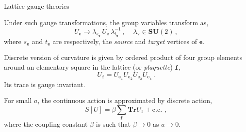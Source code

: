 \documentclass{beamer}
\newcommand\italictext[1]{\textcolor{italics}{\textit{#1}}}
\begin{document}
\begin{frame}{Lattice gauge theories}
    \begin{list}{\maltese}{\leftmargin=1em \itemindent=0em}
        \item<1-> Under such gauge transformations, the group variables transform as,
        \begin{equation}
            U_\mathtt{e}\to\lambda_{s_\mathtt{e}}\,U_\mathtt{e}\,\lambda_{t_\mathtt{e}}^{-1}\,,\,\,\,\,\,\,\, \lambda_{\mathtt{v}}\in\mathbf{SU}(2)\,,
        \end{equation}
        where $s_\mathtt{e}$ and $t_\mathtt{e}$ are respectively, the \italictext{source} and \italictext{target} vertices of $\mathtt{e}$.
        \item<2-> Discrete version of curvature is given by ordered product of four group elements around an elementary square in the lattice (or \italictext{plaquette}) $\mathtt{f}$,
        \begin{equation}\label{u_f}
            U_\mathtt{f}=U_\mathtt{e_1}U_\mathtt{e_2}U_\mathtt{e_3}U_\mathtt{e_4}\,.
        \end{equation}
        Its trace is gauge invariant.
        \item<3-> For small $a$, the continuous action is approximated by discrete action,
        \begin{equation}
            S[U]=\beta\sum_\mathtt{f}\mathbf{Tr}U_\mathtt{f}+\text{c.c.}\,\,,
        \end{equation}
        where the coupling constant $\beta$ is such that $\beta\to 0$ as $a\to 0$.
    \end{list}
\end{frame}
\end{document}
